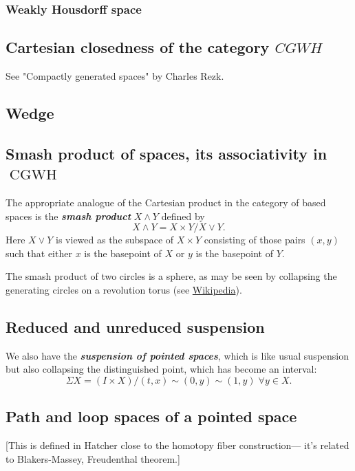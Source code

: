 \subsubsection*{Weakly Housdorff space}

\subsection*{Cartesian closedness of the category $CGWH$}
See "Compactly generated spaces" by Charles Rezk.

\subsection*{Wedge}

\subsection{Smash product of spaces, its associativity in \texorpdfstring{$\operatorname{CGWH}$}{CGWH}}

The appropriate analogue of the Cartesian product in the category of based spaces is the \textbf{\textit{smash product}} $X\wedge Y$ defined by
	\[X\wedge Y=X\times Y/X\vee Y.\]
	Here $X\vee Y$ is viewed as the subspace of $X\times Y$ consisting of those pairs $(x,y)$ such that either $x$ is the basepoint of $X$ or $y$ is the basepoint of $Y$.
\begin{example}
	The smash product of two circles is a sphere, as may be seen by collapsing the generating circles on a revolution torus (see \href{https://en.wikipedia.org/wiki/Smash_product#/media/File:Visualization_of_the_smash_product_of_two_circles.gif}{Wikipedia}).
\end{example}

\subsection*{Reduced and unreduced suspension}
We also have the \textbf{\textit{suspension of pointed spaces}}, which is like usual suspension but also collapsing the distinguished point, which has become an interval:
\[\Sigma X=(I\times X)/(t,x)\sim (0,y)\sim (1,y)\;\forall y\in X.\]

\subsection{Path and loop spaces of a pointed space}
[This is defined in Hatcher close to the homotopy fiber construction--- it's related to Blakers-Massey, Freudenthal theorem.]

